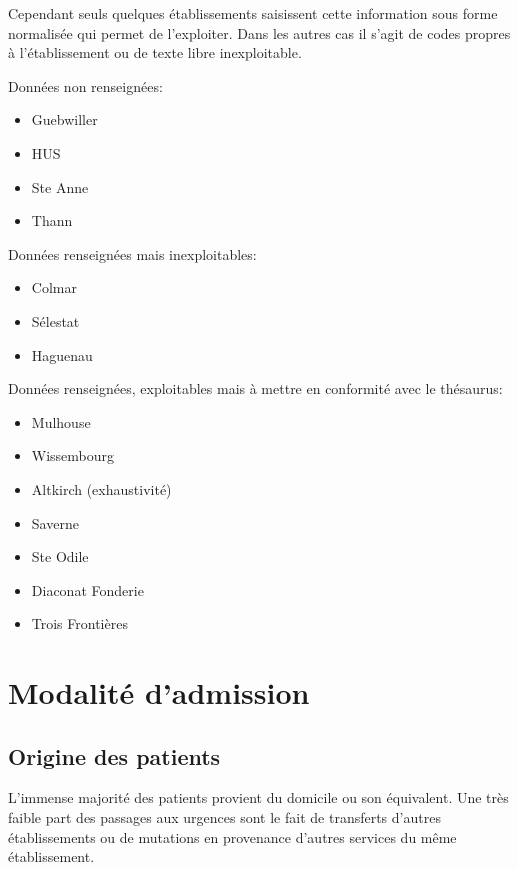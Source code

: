 \documentclass[12pt,english,french,twoside]{book}\usepackage[]{graphicx}\usepackage[]{color}
\begin{document}
Cependant seuls quelques établissements saisissent cette information sous forme normalisée qui permet de l'exploiter. Dans les autres cas il s'agit de codes propres à l'établissement ou de texte libre inexploitable.

Données non renseignées:
\begin{itemize}
  \item Guebwiller
  \item HUS
  \item Ste Anne
  \item Thann
\end{itemize}

Données renseignées mais inexploitables:
\begin{itemize}
  \item Colmar
  \item Sélestat
  \item Haguenau
\end{itemize}

Données renseignées, exploitables mais à mettre en conformité avec le thésaurus:
\begin{itemize}
  \item Mulhouse
  \item Wissembourg
  \item Altkirch (exhaustivité)
  \item Saverne
  \item Ste Odile
  \item Diaconat Fonderie
  \item Trois Frontières
\end{itemize}

\newpage
\chapter{Modalité d'admission}



\section*{Origine des patients}


L'immense majorité des patients provient du domicile ou son équivalent. Une très faible part des passages aux urgences sont le fait de transferts d'autres établissements ou de mutations en provenance d'autres services du même établissement.
\end{document}
